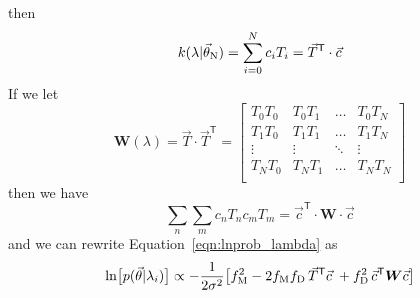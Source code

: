 \documentclass[preprint]{aastex} %
\newcommand{\vt}{\vec{\theta}}
\newcommand{\vN}{\vt_{\rm N}}
\newcommand{\vc}{\vec{c}}
\newcommand{\fM}{f_{\rm M}}
\newcommand{\fD}{f_{\rm D}}
\newcommand{\trans}{\mathsf{T}}
\begin{document}
then 
\begin{equation}
  k(\lambda | \vN) = \sum^N_{i = 0} c_i T_i = \vec{T}^\trans \cdot \vc
\end{equation}
If we let 
\begin{equation}
  {\bm W}(\lambda) = \vec{T} \cdot \vec{T}^\trans = 
  \begin{bmatrix}
T_0 T_0 & T_0 T_1 &  \hdots & T_0 T_N \\
T_1 T_0 & T_1 T_1 &  \hdots & T_1 T_N \\
\vdots  & \vdots  &  \ddots & \vdots \\
T_N T_0 & T_N T_1 &  \hdots & T_N T_N \\
  \end{bmatrix}
\end{equation}
then we have
\begin{equation}
  \sum_n \sum_m c_n T_n c_m T_m = \vc^\trans \cdot {\bm W} \cdot \vc
\end{equation}
and we can rewrite Equation~\ref{eqn:lnprob_lambda} as 
\begin{equation}
  \ln \bigl [p(\vt | \lambda_i) \bigr] \propto -\frac{1}{2 \sigma^2} \bigl [ \fM^2 - 2 \fM \fD\, \vec{T}^\trans \vc \; + \fD^2 \, \vc^\trans {\bm W}  \vc \bigr ]
\end{equation}
\end{document}
